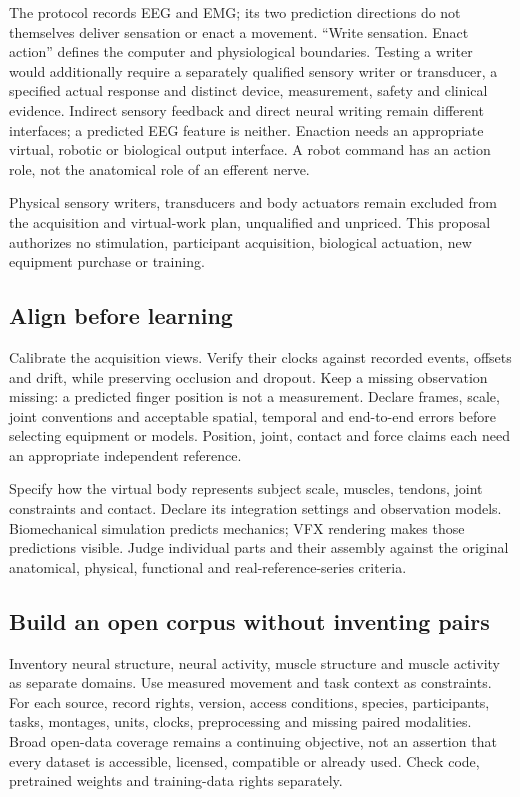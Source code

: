 The protocol records EEG and EMG; its two prediction directions do not themselves deliver sensation or enact a movement. ``Write sensation. Enact action'' defines the computer and physiological boundaries. Testing a writer would additionally require a separately qualified sensory writer or transducer, a specified actual response and distinct device, measurement, safety and clinical evidence. Indirect sensory feedback and direct neural writing remain different interfaces; a predicted EEG feature is neither. Enaction needs an appropriate virtual, robotic or biological output interface. A robot command has an action role, not the anatomical role of an efferent nerve.

Physical sensory writers, transducers and body actuators remain excluded from the acquisition and virtual-work plan, unqualified and unpriced. This proposal authorizes no stimulation, participant acquisition, biological actuation, new equipment purchase or training.

\subsection{Align before learning}

Calibrate the acquisition views. Verify their clocks against recorded events,
offsets and drift, while preserving occlusion and dropout. Keep a missing
observation missing: a predicted finger position is not a measurement. Declare
frames, scale, joint conventions and acceptable spatial, temporal and end-to-end
errors before selecting equipment or models. Position, joint, contact and force
claims each need an appropriate independent reference.

Specify how the virtual body represents subject scale, muscles, tendons, joint
constraints and contact. Declare its integration settings and observation
models. Biomechanical simulation predicts mechanics; VFX rendering makes those
predictions visible. Judge individual parts and their assembly against the
original anatomical, physical, functional and real-reference-series criteria.

\subsection{Build an open corpus without inventing pairs}

Inventory neural structure, neural activity, muscle structure and muscle
activity as separate domains. Use measured movement and task context as
constraints. For each source, record rights, version, access conditions,
species, participants, tasks, montages, units, clocks, preprocessing and missing
paired modalities. Broad open-data coverage remains a continuing objective,
not an assertion that every dataset is accessible, licensed, compatible or
already used. Check code, pretrained weights and training-data rights separately.

